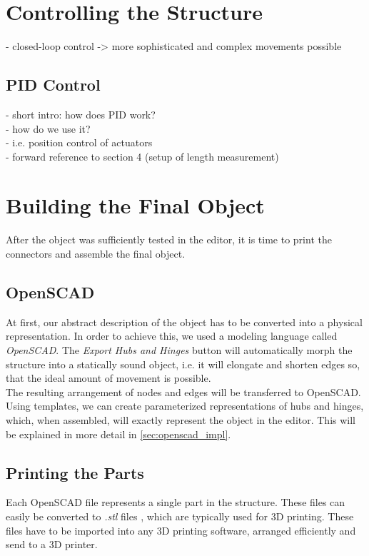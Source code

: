 \section{Controlling the Structure}
- closed-loop control -> more sophisticated and complex movements possible\\
\subsection{PID Control}
- short intro: how does PID work?\\
- how do we use it?\\
- i.e. position control of actuators\\
- forward reference to section 4 (setup of length measurement)\\
\section{Building the Final Object}
After the object was sufficiently tested in the editor, it is time to print the connectors and assemble the final object.
\subsection{OpenSCAD}
At first, our abstract description of the object has to be converted into a physical representation. In order to achieve this, we used a modeling language called \textit{OpenSCAD}. The \textit{Export Hubs and Hinges} button will automatically morph the structure into a statically sound object, i.e. it will elongate and shorten edges so, that the ideal amount of movement is possible. \\
The resulting arrangement of nodes and edges will be transferred to OpenSCAD. Using templates, we can create parameterized representations of hubs and hinges, which, when assembled, will exactly represent the object in the editor. This will be explained in more detail in \ref{sec:openscad_impl}.
\subsection{Printing the Parts}
Each OpenSCAD file represents a single part in the structure. These files can easily be converted to \textit{.stl} files , which are typically used for 3D printing. These files have to be imported into any 3D printing software, arranged efficiently and send to a 3D printer. 
